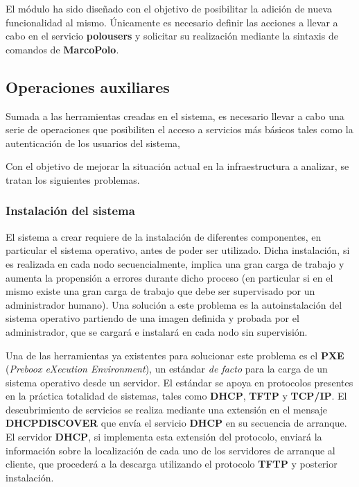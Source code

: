 El módulo ha sido diseñado con el objetivo de posibilitar la adición de nueva funcionalidad al mismo. Únicamente es necesario definir las acciones a llevar a cabo en el servicio \textbf{polousers} y solicitar su realización mediante la sintaxis de comandos de \textbf{MarcoPolo}.


\subsection{Operaciones auxiliares}

Sumada a las herramientas creadas en el sistema, es necesario llevar a cabo una serie de operaciones que posibiliten el acceso a servicios más básicos tales como la autenticación de los usuarios del sistema, %

Con el objetivo de mejorar la situación actual en la infraestructura a analizar, se tratan los siguientes problemas.

\subsubsection{Instalación del sistema}

El sistema a crear requiere de la instalación de diferentes componentes, en particular el sistema operativo, antes de poder ser utilizado. Dicha instalación, si es realizada en cada nodo secuencialmente, implica una gran carga de trabajo y aumenta la propensión a errores durante dicho proceso (en particular si en el mismo existe una gran carga de trabajo que debe ser supervisado por un administrador humano). Una solución a este problema es la autoinstalación del sistema operativo partiendo de una imagen definida y probada por el administrador, que se cargará e instalará en cada nodo sin supervisión.

Una de las herramientas ya existentes para solucionar este problema es el \textbf{PXE} (\textit{Preboox eXecution Environment})\cite{pxeintel}, un estándar \textit{de facto}\cite{avramov:architecture} para la carga de un sistema operativo desde un servidor. El estándar se apoya en protocolos presentes en la práctica totalidad de sistemas, tales como \textbf{DHCP}, \textbf{TFTP} y \textbf{TCP/IP}. El descubrimiento de servicios se realiza mediante una extensión en el mensaje \textbf{DHCPDISCOVER} que envía el servicio \textbf{DHCP} en su secuencia de arranque\cite{rfc4578}. El servidor \textbf{DHCP}, si implementa esta extensión del protocolo, enviará la información sobre la localización de cada uno de los servidores de arranque al cliente, que procederá a la descarga utilizando el protocolo \textbf{TFTP} y posterior instalación\cite{pxeoverview}.


